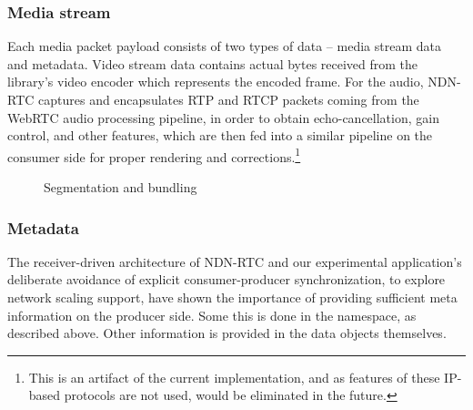\documentclass{icn/sig-alternate-2012} %
\newcommand{\ndnrtcName}{NDN-RTC} %
\begin{document}
\subsubsection{Media stream}
Each media packet payload consists of two types of data -- media stream data and metadata. Video stream data contains actual bytes received from the library's video encoder which represents the encoded frame. For the audio, \ndnrtcName{} captures and encapsulates RTP and RTCP packets coming from the WebRTC audio processing pipeline, in order to obtain echo-cancellation, gain control, and other features, which are then fed into a similar pipeline on the consumer side for proper rendering and corrections.\footnote{This is an artifact of the current implementation, and as features of these IP-based protocols are not used, would be eliminated in the future.}


\begin{figure}[t!]
\centering
{}
\caption{Segmentation and bundling}
\end{figure}

\subsubsection{Metadata}

The receiver-driven architecture of \ndnrtcName{} and our experimental application's deliberate avoidance of explicit consumer-producer synchronization, to explore network scaling support, have shown the importance of providing sufficient meta information on the producer side. Some this is done in the namespace, as described above.  Other information is provided in the data objects themselves. 
\end{document}
